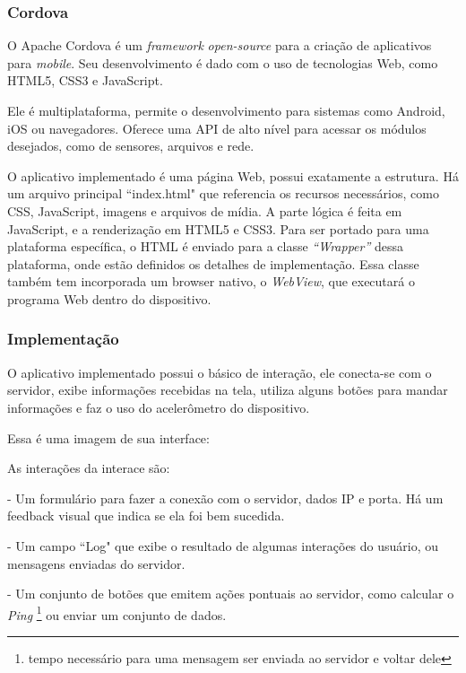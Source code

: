 \documentclass[a4paper,12pt]{article}
\begin{document}
\subsubsection{Cordova}

O Apache Cordova é um \emph{framework} \emph{open-source} para a criação de aplicativos para \emph{mobile}. Seu desenvolvimento é dado com o uso de tecnologias Web, como HTML5, CSS3 e JavaScript.

Ele é multiplataforma, permite o desenvolvimento para sistemas como Android, iOS ou navegadores. Oferece uma API de alto nível para acessar os módulos desejados, como de sensores, arquivos e rede.

O aplicativo implementado é uma página Web, possui exatamente a estrutura. Há um arquivo principal “index.html" que referencia os recursos necessários, como CSS, JavaScript, imagens e arquivos de mídia. A parte lógica é feita em JavaScript, e a renderização em HTML5 e CSS3. Para ser portado para uma plataforma específica, o HTML é enviado para a classe \emph{“Wrapper”} dessa plataforma, onde estão definidos os detalhes de implementação. Essa classe também tem incorporada um browser nativo, o \emph{WebView}, que executará o programa Web dentro do dispositivo.

\subsubsection{Implementação}

O aplicativo implementado possui o básico de interação, ele conecta-se com o servidor, exibe informações recebidas na tela, utiliza alguns botões para mandar informações e faz o uso do acelerômetro do dispositivo.

Essa é uma imagem de sua interface:


As interações da interace são: %

- Um formulário para fazer a conexão com o servidor, dados IP e porta. Há um feedback visual que indica se ela foi bem sucedida.

- Um campo “Log" que exibe o resultado de algumas interações do usuário, ou mensagens enviadas do servidor.

- Um conjunto de botões que emitem ações pontuais ao servidor, como calcular o \emph{Ping} \footnote{tempo necessário para uma mensagem ser enviada ao servidor e voltar dele} ou enviar um conjunto de dados.
\end{document}
